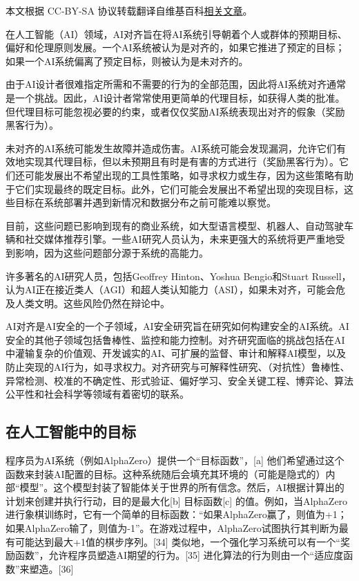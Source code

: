 
本文根据 CC-BY-SA 协议转载翻译自维基百科\href{https://en.wikipedia.org/wiki/AI_alignment}{相关文章}。

在人工智能（AI）领域，AI对齐旨在将AI系统引导朝着个人或群体的预期目标、偏好和伦理原则发展。一个AI系统被认为是对齐的，如果它推进了预定的目标；如果一个AI系统偏离了预定目标，则被认为是未对齐的。

由于AI设计者很难指定所需和不需要的行为的全部范围，因此将AI系统对齐通常是一个挑战。因此，AI设计者常常使用更简单的代理目标，如获得人类的批准。但代理目标可能忽视必要的约束，或者仅仅奖励AI系统表现出对齐的假象（奖励黑客行为）。

未对齐的AI系统可能发生故障并造成伤害。AI系统可能会发现漏洞，允许它们有效地实现其代理目标，但以未预期且有时是有害的方式进行（奖励黑客行为）。它们还可能发展出不希望出现的工具性策略，如寻求权力或生存，因为这些策略有助于它们实现最终的既定目标。此外，它们可能会发展出不希望出现的突现目标，这些目标在系统部署并遇到新情况和数据分布之前可能难以察觉。

目前，这些问题已影响到现有的商业系统，如大型语言模型、机器人、自动驾驶车辆和社交媒体推荐引擎。一些AI研究人员认为，未来更强大的系统将更严重地受到影响，因为这些问题部分源于系统的高能力。

许多著名的AI研究人员，包括Geoffrey Hinton、Yoshua Bengio和Stuart Russell，认为AI正在接近类人（AGI）和超人类认知能力（ASI），如果未对齐，可能会危及人类文明。这些风险仍然在辩论中。

AI对齐是AI安全的一个子领域，AI安全研究旨在研究如何构建安全的AI系统。AI安全的其他子领域包括鲁棒性、监控和能力控制。对齐研究面临的挑战包括在AI中灌输复杂的价值观、开发诚实的AI、可扩展的监督、审计和解释AI模型，以及防止突现的AI行为，如寻求权力。对齐研究与可解释性研究、（对抗性）鲁棒性、异常检测、校准的不确定性、形式验证、偏好学习、安全关键工程、博弈论、算法公平性和社会科学等领域有着密切的联系。
\subsection{在人工智能中的目标}
程序员为AI系统（例如AlphaZero）提供一个“目标函数”，[a] 他们希望通过这个函数来封装AI配置的目标。这种系统随后会填充其环境的（可能是隐式的）内部“模型”。这个模型封装了智能体关于世界的所有信念。然后，AI根据计算出的计划来创建并执行行动，目的是最大化[b] 目标函数[c] 的值。例如，当AlphaZero进行象棋训练时，它有一个简单的目标函数：“如果AlphaZero赢了，则值为+1；如果AlphaZero输了，则值为-1”。在游戏过程中，AlphaZero试图执行其判断为最有可能达到最大+1值的棋步序列。[34] 类似地，一个强化学习系统可以有一个“奖励函数”，允许程序员塑造AI期望的行为。[35] 进化算法的行为则由一个“适应度函数”来塑造。[36]
